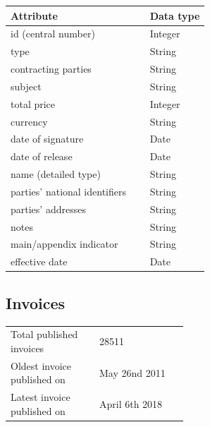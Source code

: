 \documentclass[thesis=B,english]{FITthesis}[2012/06/26]
\begin{document}
    \begin{center}
        \begin{tabular}{  p{0.7\linewidth} | p{0.3\linewidth} }
        Attribute & Data type\\ \hline
        id (central number) & Integer \\
        type & String \\
        contracting parties & String \\
        subject & String \\
        total price & Integer \\
        currency & String \\
        date of signature & Date \\
        date of release & Date \\
        name (detailed type) & String \\
        parties' national identifiers & String \\
        parties' addresses & String \\
        notes & String \\
        main/appendix indicator & String \\
        effective date & Date \\
        \end{tabular}
    \end{center}
    \newpage
	\subsection{Invoices}
	\begin{tabular}{  p{0.5\linewidth}  l }
        \\
        Total published invoices & 28511 \\
        Oldest invoice published on & May 26nd 2011\\
        Latest invoice published on & April 6th 2018 \\
        \end{tabular}
        
\end{document}
